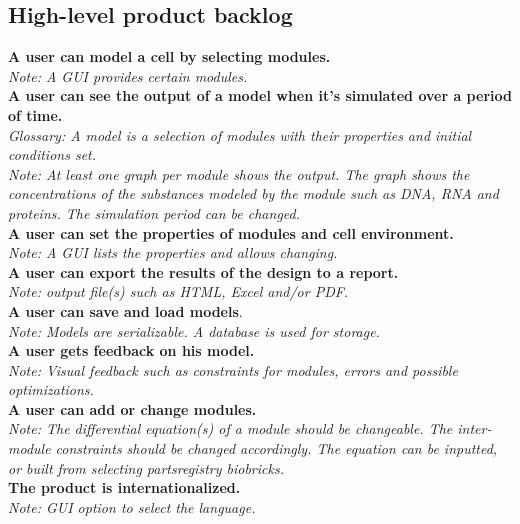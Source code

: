 \documentclass[10pt,a4paper]{report}
\begin{document}
		\subsection{High-level product backlog}
			\textbf{A user can model a cell by selecting modules.}\\
			\indent
				\textit{Note: A GUI provides certain modules.}\\
			\textbf{A user can see the output of a model when it’s simulated over a period of time.}\\
			\indent
				\textit{Glossary: A model is a selection of modules with their properties and initial conditions set.}\\
			\indent
				\textit{Note: At least one graph per module shows the output. The graph shows the concentrations of the substances modeled by the module such as DNA, RNA and proteins. The simulation period can be changed.}\\
			\textbf{A user can set the properties of modules and cell environment.}\\
			\indent
				\textit{Note: A GUI lists the properties and allows changing.}\\
			\textbf{A user can export the results of the design to a report.}\\
			\indent
				\textit{Note: output file(s) such as HTML, Excel and/or PDF.}\\
			\textbf{A user can save and load models}.\\
			\indent
				\textit{Note: Models are serializable. A database is used for storage.}\\
			\textbf{A user gets feedback on his model.}\\
			\indent
				\textit{Note: Visual feedback such as constraints for modules, errors and possible optimizations.}\\
			\textbf{A user can add or change modules.}\\
			\indent
				\textit{Note: The differential equation(s) of a module should be changeable. The inter-module constraints should be changed accordingly. The equation can be inputted, or built from selecting partsregistry biobricks.}\\
			\textbf{The product is internationalized.}\\
			\indent
				\textit{Note: GUI option to select the language.}
\end{document}
